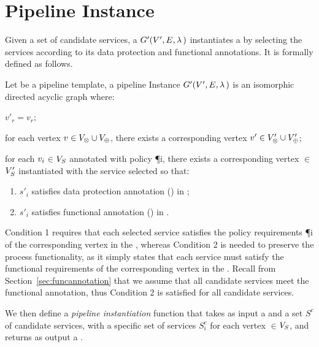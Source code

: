 \section{Pipeline Instance}\label{sec:instance}
Given a set of candidate services, a \pipelineInstance $G'(V',E,\lambda\,)$ instantiates a \pipelineTemplate \tChartFunction by selecting the services according to its data protection and functional annotations. It is formally defined as follows.

    \begin{definition}\label{def:instance}
      Let \tChartFunction be a pipeline template, a pipeline Instance $G'(V',E,\lambda\,)$ is an isomorphic directed acyclic graph where:
      \begin{enumerate*}[label=\textit{\roman*})]
        \item $v'_r$$=$$v_r$;
        \item for each vertex $v_{}\in V_{\otimes}\cup V_{\oplus}$, there exists a corresponding vertex $v'_{}\in V'_{\otimes}\cup V'_{\oplus}$;
        \item for each $v_{i}$$\in$$V_S$ annotated with policy \P{i}, there exists a corresponding vertex $\in$$V'_S$ instantiated with the service  selected so that:
      \end{enumerate*}
      \begin{enumerate}[label=\arabic*)]
        \item $s'_i$ satisfies data protection annotation \myLambda() in \tChartFunction;
        \item $s'_i$ satisfies functional annotation \myGamma() in \tChartFunction.
      \end{enumerate}
    \end{definition}

Condition 1 requires that each selected service  satisfies the policy requirements \P{i} of the corresponding vertex  in the \pipelineTemplate, whereas Condition 2 is needed to preserve the process functionality, as it simply states that each service  must satisfy the functional requirements  of the corresponding vertex  in the \pipelineTemplate. Recall from Section~\ref{sec:funcannotation} that we assume that all candidate services meet the functional annotation, thus Condition 2 is satisfied for all candidate services.

    We then define a \emph{pipeline instantiation} function that takes as input a \pipelineTemplate \tChartFunction and a set $S^c$ of candidate services, with a specific set of services $S^c_{i}$ for each vertex $\in$$V_S$, and returns as output a \pipelineInstance \iChartFunction.

